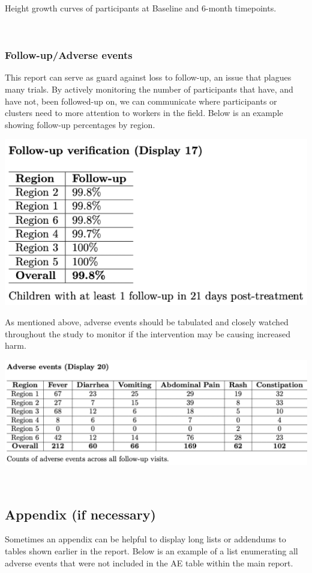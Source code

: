 \documentclass[
]{book}
\begin{document}
Height growth curves of participants at Baseline and 6-month timepoints.

\(~\)

\subsubsection{Follow-up/Adverse events}\label{follow-upadverse-events}

This report can serve as guard against loss to follow-up, an issue that plagues many trials. By actively monitoring the number of participants that have, and have not, been followed-up on, we can communicate where participants or clusters need to more attention to workers in the field. Below is an example showing follow-up percentages by region.

\includegraphics[width=0.5\linewidth,height=0.35\textheight]{images/report-images/followup}

As mentioned above, adverse events should be tabulated and closely watched throughout the study to monitor if the intervention may be causing increased harm.

\includegraphics[width=0.65\linewidth,height=0.45\textheight]{images/report-images/adverse_events}

\(~\)

\subsection{Appendix (if necessary)}\label{appendix-if-necessary}

Sometimes an appendix can be helpful to display long lists or addendums to tables shown earlier in the report. Below is an example of a list enumerating all adverse events that were not included in the AE table within the main report.
\end{document}
